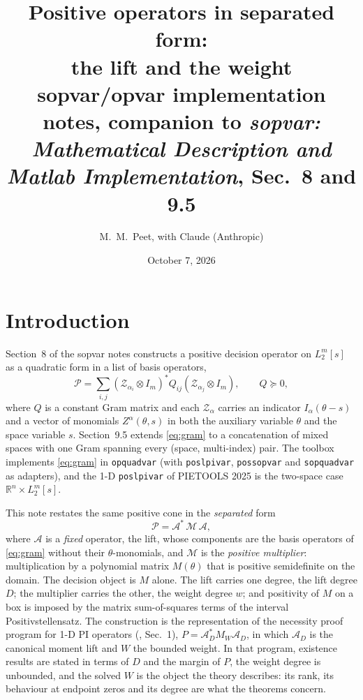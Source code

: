 \documentclass[12pt]{article}
\title{Positive operators in separated form: \\ the lift and the weight \\
\large sopvar/opvar implementation notes, companion to \emph{sopvar: Mathematical Description and Matlab Implementation}, Sec.~8 and 9.5}
\author{M.~M.~Peet, with Claude (Anthropic)}
\date{October 7, 2026}
\newcommand{\R}{\mathbb{R}}
\newcommand{\mcl}[1]{\mathcal{#1}}
\newcommand{\code}[1]{\texttt{#1}}
\newcommand{\file}[1]{\path{#1}}      %
\theoremstyle{plain}
\theoremstyle{definition}
\theoremstyle{remark}
\begin{document}
\maketitle

\section{Introduction}

Section~8 of the sopvar notes constructs a positive decision operator on $L_2^m[s]$ as a quadratic form in a list of basis operators,
\begin{equation}\label{eq:gram}
\mcl P=\sum_{i,j}(\mcl Z_{\alpha_i}\otimes I_m)^*Q_{ij}(\mcl Z_{\alpha_j}\otimes I_m),\qquad Q\succeq 0,
\end{equation}
where $Q$ is a constant Gram matrix and each $\mcl Z_{\alpha}$ carries an indicator $I_\alpha(\theta-s)$ and a vector of monomials $Z^\alpha(\theta,s)$ in both the auxiliary variable $\theta$ and the space variable $s$. Section~9.5 extends \eqref{eq:gram} to a concatenation of mixed spaces with one Gram spanning every (space, multi-index) pair. The toolbox implements \eqref{eq:gram} in \code{opquadvar} (with \code{poslpivar}, \code{possopvar} and \code{sopquadvar} as adapters), and the 1-D \code{poslpivar} of PIETOOLS 2025 is the two-space case $\R^{n}\times L_2^m[s]$.

This note restates the same positive cone in the \emph{separated} form
\begin{equation}\label{eq:sep}
\mcl P=\mcl A^*\,\mcl M\,\mcl A,
\end{equation}
where $\mcl A$ is a \emph{fixed} operator, the lift, whose components are the basis operators of \eqref{eq:gram} without their $\theta$-monomials, and $\mcl M$ is the \emph{positive multiplier}: multiplication by a polynomial matrix $M(\theta)$ that is positive semidefinite on the domain. The decision object is $M$ alone. The lift carries one degree, the lift degree $D$; the multiplier carries the other, the weight degree $w$; and positivity of $M$ on a box is imposed by the matrix sum-of-squares terms of the interval Positivstellensatz. The construction is the representation of the necessity proof program for 1-D PI operators (\file{proof_roadmap.md}, Sec.~1), $P=\mcl A_D^*M_W\mcl A_D$, in which $\mcl A_D$ is the canonical moment lift and $W$ the bounded weight. In that program, existence results are stated in terms of $D$ and the margin of $P$, the weight degree is unbounded, and the solved $W$ is the object the theory describes: its rank, its behaviour at endpoint zeros and its degree are what the theorems concern.
\end{document}
